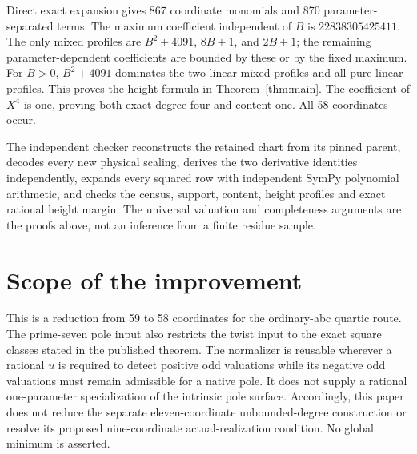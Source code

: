 \documentclass[11pt,a4paper]{article}
\begin{document}
Direct exact expansion gives 867 coordinate monomials and 870
parameter-separated terms. The maximum coefficient independent of $B$
is $22838305425411$. The only mixed profiles are
$B^2+4091$, $8B+1$, and $2B+1$; the remaining parameter-dependent
coefficients are bounded by these or by the fixed maximum. For $B>0$,
$B^2+4091$ dominates the two linear mixed profiles and all pure linear
profiles. This proves the height formula in Theorem~\ref{thm:main}.
The coefficient of $X^4$ is one, proving both exact degree four and
content one. All 58 coordinates occur.

The independent checker reconstructs the retained chart from its pinned
parent, decodes every new physical scaling, derives the two derivative
identities independently, expands every squared row with independent
SymPy polynomial arithmetic, and checks the census, support, content,
height profiles and exact rational height margin. The universal
valuation and completeness arguments are the proofs above, not an
inference from a finite residue sample.

\section{Scope of the improvement}

This is a reduction from 59 to 58 coordinates for the ordinary-abc
quartic route. The prime-seven pole input also restricts the twist input to the exact
square classes stated in the published theorem. The normalizer is reusable wherever a rational $u$ is
required to detect positive odd valuations while its negative odd
valuations must remain admissible for a native pole. It does not supply
a rational one-parameter specialization of the intrinsic pole surface.
Accordingly, this paper does not reduce the separate eleven-coordinate
unbounded-degree construction or resolve its proposed nine-coordinate
actual-realization condition. No global minimum is asserted.
\end{document}
